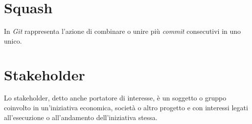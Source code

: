 \section{Squash}
In \emph{Git} rappresenta l'azione di combinare o unire più \emph{commit} consecutivi in uno unico.

\section{Stakeholder}
Lo stakeholder, detto anche portatore di interesse, è un soggetto o gruppo coinvolto in un'iniziativa economica, società o altro progetto e con interessi legati all’esecuzione o all’andamento dell'iniziativa stessa.
